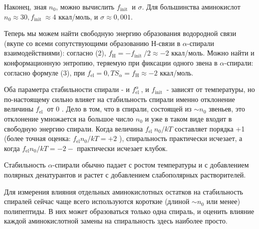 \documentclass[
11pt,%
tightenlines,%
twoside,%
onecolumn,%
nofloats,%
nobibnotes,%
nofootinbib,%
superscriptaddress,%
noshowpacs,%
centertags]%
{revtex4}
\begin{document}
Наконец, зная $n_0$, можно вычислить $f_{\text {init }}$ и $\sigma$. Для большинства аминокислот $n_0 \approx 30, f_{\text {init }} \approx 4$ ккал/моль, и $\sigma \approx 0,001$.

Теперь мы можем найти свободную энергию образования водородной связи (вкупе со всеми сопутствующими образованию Н-связи в $\alpha$-спирали взаимодействиями): согласно (2), $f_{\mathrm{H}}=-f_{\text {init }} / 2 \approx-2$ ккал/моль. Можно найти и конформационную энтропию, теряемую при фиксации одного звена в $\alpha$-спирали: согласно формуле (3), при $f_{\mathrm{el}}=0, T S_\alpha=f_{\mathrm{H}} \approx-2$ ккал/моль.

Оба параметра стабильности спирали - и $f_{\text {el }}^\alpha$, и $f_{\text {init }}$ - зависят от температуры, но по-настоящему сильно влияет на стабильность спирали именно отклонение величины $f_{\text {el }}$ от 0 . Дело в том, что в спирали, состоящей из $\sim n_0$ звеньев, это отклонение умножается на большое число $n_0$ и уже в таком виде входит в свободную энергию спирали. Когда величина $f_{\text {el }} n_0 / k T$ составляет порядка +1 (более точная оценка: $f_{\mathrm{el}} n_0 / k T=+2$ ), спиральность практически исчезает, а когда $f_{\mathrm{el}} n_0 / k T=-2-$ практически исчезает клубок. 

Стабильность $\alpha$-спирали обычно падает с ростом температуры и с добавлением полярных денатурантов и растет с добавлением слабополярных растворителей.

Для измерения влияния отдельных аминокислотных остатков на стабильность спиралей сейчас чаще всего используются короткие (длиной $\sim n_0$ или менее) полипептиды. В них может образоваться только одна спираль, и оценить влияние каждой аминокислотной замены на спиральность здесь наиболее просто. 


\newpage
\end{document}
